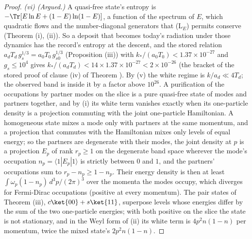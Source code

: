 \begin{proof}
\emph{(vi) (Argued.)} A quasi-free state's entropy is $-\Tr[E\ln E + (1 - E)\ln(1 - E)]$, a function of the spectrum of $E$, which quadratic flows and the number-diagonal generators that (L$_{E}$) permits conserve (Theorem (i), (ii)). So a deposit that becomes today's radiation under those dynamics has the record's entropy at the descent, and the stored relation $a_{d}T_{d}\,g_{s}^{1/3} = a_{0}T_{0}\,g_{s0}^{1/3}$ (Proposition (iii)) with $k_{*}/(a_{0}T_{0}) < 1.37 \times 10^{-27}$ and $g_{s} \le 10^{4}$ gives $k_{*}/(a_{d}T_{d}) < 14 \times 1.37 \times 10^{-27} < 2 \times 10^{-26}$ (the bracket of the stored proof of clause (iv) of Theorem ). By (v) the white regime is $k/a_{d} \ll 4T_{d}$; the observed band is inside it by a factor above $10^{26}$. A purification of the occupations by partner modes on the slice is a pure quasi-free state of modes and partners together, and by (i) its white term vanishes exactly when its one-particle density is a projection commuting with the joint one-particle Hamiltonian. A homogeneous state mixes a mode only with partners at the same momentum, and a projection that commutes with the Hamiltonian mixes only levels of equal energy; so the partners are degenerate with their modes, the joint density at $p$ is a projection $E_{p}$ of rank $r_{p} \ge 1$ on the degenerate band space wherever the mode's occupation $n_{p} = \langle 1|E_{p}|1\rangle$ is strictly between $0$ and $1$, and the partners' occupations sum to $r_{p} - n_{p} \ge 1 - n_{p}$. Their energy density is then at least $\int\omega_{p}(1 - n_{p})\,d^{3}p/(2\pi)^{3}$ over the momenta the modes occupy, which diverges for Fermi-Dirac occupations (positive at every momentum). The pair states of Theorem (iii), $c\ket{00} + s\ket{11}$, superpose levels whose energies differ by the sum of the two one-particle energies; with both positive on the slice the state is not stationary, and in the Weyl form of (ii) its white term is $4p^{2}n(1 - n)$ per momentum, twice the mixed state's $2p^{2}n(1 - n)$.
\end{proof}
